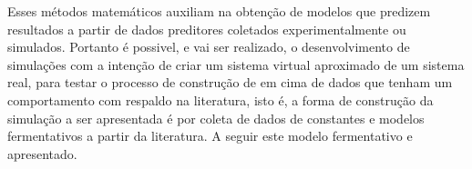 	Esses métodos matemáticos auxiliam na obtenção de modelos que predizem resultados a partir de dados preditores coletados experimentalmente ou simulados. Portanto é possivel, e vai ser realizado, o desenvolvimento de simulações com a intenção de criar um sistema virtual aproximado de um sistema real, para testar o processo de construção de \plural{\getbuffer[sens]} em cima de dados que tenham um comportamento com respaldo na literatura, isto é, a forma de construção da simulação a ser apresentada é por coleta de dados de constantes e modelos fermentativos a partir da literatura. A seguir este modelo fermentativo e apresentado.
\stopsection

